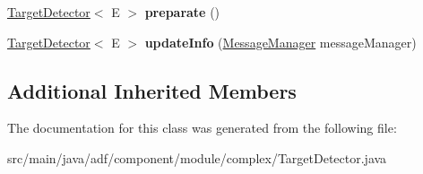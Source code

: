 \begin{DoxyCompactItemize}
\item 
\hypertarget{classadf_1_1component_1_1module_1_1complex_1_1TargetDetector_a35d229e5ec0ef648aa8efd895abf5ebc}{}\label{classadf_1_1component_1_1module_1_1complex_1_1TargetDetector_a35d229e5ec0ef648aa8efd895abf5ebc} 
\hyperlink{classadf_1_1component_1_1module_1_1complex_1_1TargetDetector}{Target\+Detector}$<$ E $>$ {\bfseries preparate} ()
\item 
\hypertarget{classadf_1_1component_1_1module_1_1complex_1_1TargetDetector_a4c22a759fe59b2b6ee23006abbfb1210}{}\label{classadf_1_1component_1_1module_1_1complex_1_1TargetDetector_a4c22a759fe59b2b6ee23006abbfb1210} 
\hyperlink{classadf_1_1component_1_1module_1_1complex_1_1TargetDetector}{Target\+Detector}$<$ E $>$ {\bfseries update\+Info} (\hyperlink{classadf_1_1agent_1_1communication_1_1MessageManager}{Message\+Manager} message\+Manager)
\end{DoxyCompactItemize}
\subsection*{Additional Inherited Members}


The documentation for this class was generated from the following file\+:\begin{DoxyCompactItemize}
\item 
src/main/java/adf/component/module/complex/Target\+Detector.\+java\end{DoxyCompactItemize}
